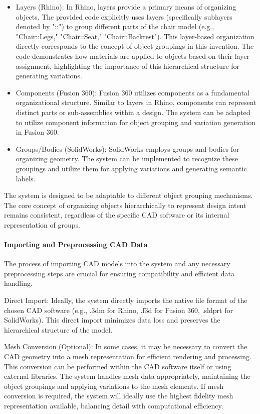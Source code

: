 \documentclass{article}
\begin{document}
\begin{itemize}
    \item Layers (Rhino): In Rhino, layers provide a primary means of organizing objects. The provided code explicitly uses layers (specifically sublayers denoted by "::") to group different parts of the chair model (e.g., "Chair::Legs," "Chair::Seat," "Chair::Backrest"). This layer-based organization directly corresponds to the concept of object groupings in this invention. The code demonstrates how materials are applied to objects based on their layer assignment, highlighting the importance of this hierarchical structure for generating variations.
    \item Components (Fusion 360): Fusion 360 utilizes components as a fundamental organizational structure. Similar to layers in Rhino, components can represent distinct parts or sub-assemblies within a design. The system can be adapted to utilize component information for object grouping and variation generation in Fusion 360.

    \item Groups/Bodies (SolidWorks): SolidWorks employs groups and bodies for organizing geometry. The system can be implemented to recognize these groupings and utilize them for applying variations and generating semantic labels.
\end{itemize}
The system is designed to be adaptable to different object grouping mechanisms. The core concept of organizing objects hierarchically to represent design intent remains consistent, regardless of the specific CAD software or its internal representation of groups.

\paragraph{Importing and Preprocessing CAD Data}
The process of importing CAD models into the system and any necessary preprocessing steps are crucial for ensuring compatibility and efficient data handling.

Direct Import: Ideally, the system directly imports the native file format of the chosen CAD software (e.g., .3dm for Rhino, .f3d for Fusion 360, .sldprt for SolidWorks). This direct import minimizes data loss and preserves the hierarchical structure of the model.

Mesh Conversion (Optional): In some cases, it may be necessary to convert the CAD geometry into a mesh representation for efficient rendering and processing. This conversion can be performed within the CAD software itself or using external libraries. The system handles mesh data appropriately, maintaining the object groupings and applying variations to the mesh elements. If mesh conversion is required, the system will ideally use the highest fidelity mesh representation available, balancing detail with computational efficiency.
\end{document}

